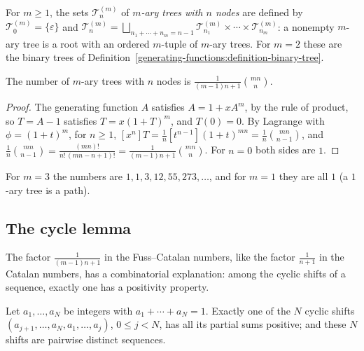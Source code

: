 \begin{definition}\label{generating-functions:definition-mary-tree}
For $m \geq 1$, the sets $\mathcal{T}^{(m)}_n$ of \emph{$m$-ary trees with $n$ nodes} are defined by $\mathcal{T}^{(m)}_0 = \{\varepsilon\}$ and
$\mathcal{T}^{(m)}_n = \bigsqcup_{n_1 + \cdots + n_m = n - 1}\mathcal{T}^{(m)}_{n_1} \times \cdots \times \mathcal{T}^{(m)}_{n_m}$: a nonempty $m$-ary tree is a root with an ordered $m$-tuple of
$m$-ary trees. For $m = 2$ these are the binary trees of Definition~\ref{generating-functions:definition-binary-tree}.
\end{definition}

\begin{corollary}\label{generating-functions:corollary-fuss-catalan}
The number of $m$-ary trees with $n$ nodes is $\frac{1}{(m - 1)n + 1}\binom{mn}{n}$.
\end{corollary}

\begin{proof}
The generating function $A$ satisfies $A = 1 + xA^m$, by the rule of product, so $T = A - 1$ satisfies $T = x(1 + T)^m$, and $T(0) = 0$. By Lagrange with $\phi = (1 + t)^m$, for $n \geq 1$,
$[x^n]T = \frac{1}{n}[t^{n-1}](1 + t)^{mn} = \frac{1}{n}\binom{mn}{n - 1}$, and $\frac{1}{n}\binom{mn}{n - 1} = \frac{(mn)!}{n!\,(mn - n + 1)!} = \frac{1}{(m - 1)n + 1}\binom{mn}{n}$. For $n = 0$ both
sides are $1$.
\end{proof}

For $m = 3$ the numbers are $1, 1, 3, 12, 55, 273, \ldots$, and for $m = 1$ they are all $1$ (a $1$-ary tree is a path).

\subsection{The cycle lemma}\label{generating-functions:subsection-cycle-lemma}

The factor $\frac{1}{(m - 1)n + 1}$ in the Fuss--Catalan numbers, like the factor $\frac{1}{n + 1}$ in the Catalan numbers, has a combinatorial explanation: among the cyclic shifts of a sequence,
exactly one has a positivity property.

\begin{lemma}\label{generating-functions:lemma-cycle}
Let $a_1, \ldots, a_N$ be integers with $a_1 + \cdots + a_N = 1$. Exactly one of the $N$ cyclic shifts $(a_{j+1}, \ldots, a_N, a_1, \ldots, a_j)$, $0 \leq j < N$, has all its partial sums positive;
and these $N$ shifts are pairwise distinct sequences.
\end{lemma}

